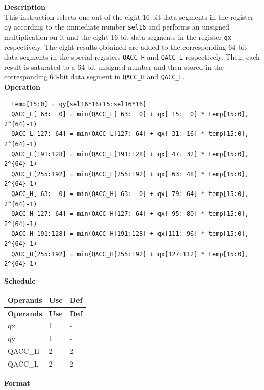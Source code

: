 \textbf{Description}\\
This instruction selects one out of the eight 16-bit data segments in the register \lstinline{qy} according to the immediate number \lstinline{sel16} and performs an unsigned multiplication on it and the eight 16-bit data segments in the register \lstinline{qx} respectively. The eight results obtained are added to the corresponding 64-bit data segments in the special registers \lstinline{QACC_H} and \lstinline{QACC_L} respectively. Then, each result is saturated to a 64-bit unsigned number and then stored in the corresponding 64-bit data segment in \lstinline{QACC_H} and \lstinline{QACC_L}.\\
\textbf{Operation}
\begin{lstlisting}
  temp[15:0] = qy[sel16*16+15:sel16*16]
  QACC_L[ 63:  0] = min(QACC_L[ 63:  0] + qx[ 15:  0] * temp[15:0], 2^{64}-1)
  QACC_L[127: 64] = min(QACC_L[127: 64] + qx[ 31: 16] * temp[15:0], 2^{64}-1)
  QACC_L[191:128] = min(QACC_L[191:128] + qx[ 47: 32] * temp[15:0], 2^{64}-1)
  QACC_L[255:192] = min(QACC_L[255:192] + qx[ 63: 48] * temp[15:0], 2^{64}-1)
  QACC_H[ 63:  0] = min(QACC_H[ 63:  0] + qx[ 79: 64] * temp[15:0], 2^{64}-1)
  QACC_H[127: 64] = min(QACC_H[127: 64] + qx[ 95: 80] * temp[15:0], 2^{64}-1)
  QACC_H[191:128] = min(QACC_H[191:128] + qx[111: 96] * temp[15:0], 2^{64}-1)
  QACC_H[255:192] = min(QACC_H[255:192] + qx[127:112] * temp[15:0], 2^{64}-1)
\end{lstlisting}

\textbf{Schedule}\\
\begin{longtable}[c]{|l|l|l|}
    \hline
    \rowcolor{lightgray}
    \textbf{Operands} & \textbf{Use} & \textbf{Def} \\\hline
    \endfirsthead
    \hline
    \rowcolor{lightgray}
     \textbf{Operands} & \textbf{Use} & \textbf{Def} \\\hline
    \endhead
    \hline
    \endfoot

     qx & 1 & - \\\hline
     qy & 1 & - \\\hline
     QACC\_H & 2 & 2 \\\hline
     QACC\_L & 2 & 2

\end{longtable}

\textbf{Format}\\

